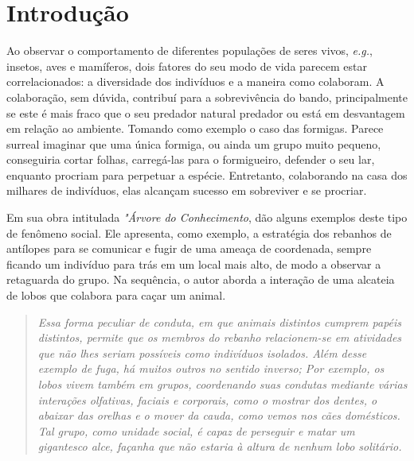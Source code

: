 
\chapter{Introdução}
\label{chap:introducao}

Ao observar o comportamento de diferentes populações de seres vivos, \textit{e.g.}, insetos, aves e mamíferos, dois fatores do seu modo de vida parecem estar correlacionados: a diversidade dos indivíduos e a maneira como colaboram. A colaboração, sem dúvida, contribuí para a sobrevivência do bando, principalmente se este é mais fraco que o seu predador natural predador ou está em desvantagem em relação ao ambiente. Tomando como exemplo o caso das formigas. Parece surreal imaginar que uma única formiga, ou ainda um grupo muito pequeno, conseguiria cortar folhas, carregá-las para o formigueiro, defender o seu lar, enquanto procriam para perpetuar a espécie. Entretanto, colaborando na casa dos milhares de indivíduos, elas alcançam sucesso em sobreviver e se procriar.

Em sua obra intitulada \textit{"Árvore do Conhecimento},  dão alguns exemplos deste tipo de  fenômeno social. Ele apresenta, como exemplo, a estratégia dos rebanhos de antílopes para se comunicar e fugir de uma ameaça de coordenada, sempre ficando um indivíduo para trás em um local mais alto, de modo a observar a retaguarda do grupo. Na sequência, o autor aborda a interação de uma alcateia de lobos que colabora para caçar um animal.

\begin{quote}
\textit{Essa forma peculiar de conduta, em que animais distintos cumprem papéis distintos, permite que os membros do rebanho relacionem-se em atividades que não lhes seriam possíveis como indivíduos isolados. Além desse exemplo de fuga, há muitos outros no sentido inverso; Por exemplo, os lobos vivem também em grupos, coordenando suas condutas mediante várias interações olfativas, faciais e corporais, como o mostrar dos dentes, o abaixar das orelhas e o mover da cauda, como vemos nos cães domésticos. Tal grupo, como unidade social, é capaz de perseguir e matar um gigantesco alce, façanha que não estaria à altura de nenhum lobo solitário.} \cite{maturana2001}
\end{quote}

